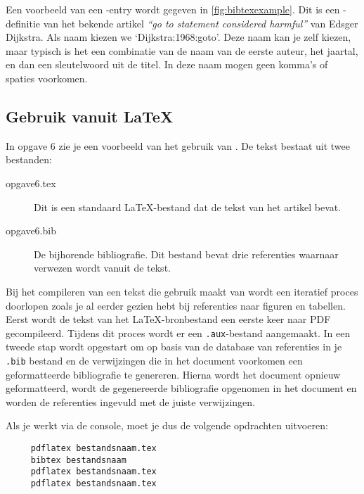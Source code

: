 \documentclass[12pt, dutch]{article}
\begin{document}
Een voorbeeld van een \BibTeX-entry wordt gegeven in
\cref{fig:bibtexexample}. Dit is een \BibTeX-definitie van het
bekende artikel \emph{``go to statement considered harmful''} van
Edsger Dijkstra. Als naam kiezen we `Dijkstra:1968:goto'. Deze naam
kan je zelf kiezen, maar typisch is het een combinatie van de naam
van de eerste auteur, het jaartal, en dan een sleutelwoord uit de
titel. In deze naam mogen geen komma's of spaties voorkomen.

\subsection{Gebruik vanuit \LaTeX}

In opgave 6 zie je een voorbeeld van het gebruik van \BibTeX. De tekst bestaat
uit twee bestanden:

\begin{description}
  \item[opgave6.tex] Dit is een standaard \LaTeX-bestand dat de
        tekst van het artikel bevat.

  \item[opgave6.bib] De bijhorende bibliografie. Dit bestand bevat
        drie referenties waarnaar verwezen wordt vanuit de tekst.
\end{description}

Bij het compileren van een tekst die gebruik maakt van \BibTeX{} wordt
een iteratief proces doorlopen zoals je al eerder gezien hebt bij
referenties naar figuren en tabellen. Eerst wordt de tekst van het
\LaTeX-bronbestand een eerste keer naar PDF gecompileerd. Tijdens dit
proces wordt er een \texttt{.aux}-bestand aangemaakt. In een tweede stap
wordt \BibTeX{} opgestart om op basis van de database van referenties in
je \texttt{.bib} bestand en de verwijzingen die in het document voorkomen een
geformatteerde bibliografie te genereren. Hierna wordt het document
opnieuw geformatteerd, wordt de gegenereerde bibliografie opgenomen in
het document en worden de referenties ingevuld met de juiste
verwijzingen.

Als je werkt via de console, moet je dus de volgende opdrachten uitvoeren:
\begin{center}
  \begin{minipage}{.7\linewidth}
    \begin{verbatim}
     pdflatex bestandsnaam.tex
     bibtex bestandsnaam
     pdflatex bestandsnaam.tex
     pdflatex bestandsnaam.tex
   \end{verbatim}
  \end{minipage}
\end{center}
\end{document}
